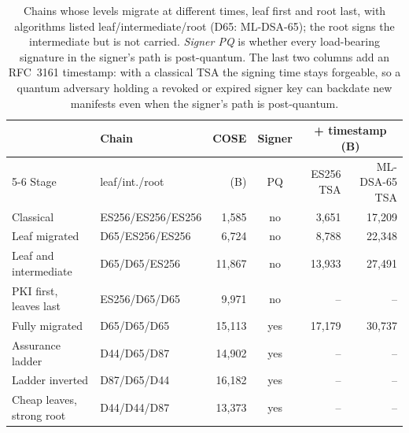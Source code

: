 \begin{table}[t]
\caption{Chains whose levels migrate at different times, leaf first and root last, with algorithms listed leaf/intermediate/root (D65: ML-DSA-65); the root signs the intermediate but is not carried. \emph{Signer PQ} is whether every load-bearing signature in the signer's path is post-quantum. The last two columns add an RFC~3161 timestamp: with a classical TSA the signing time stays forgeable, so a quantum adversary holding a revoked or expired signer key can backdate new manifests even when the signer's path is post-quantum.}
\label{tab:mixedchain}
\small
\setlength{\tabcolsep}{3.3pt}
\begin{tabular}{llrcrr}
\toprule
 & Chain & COSE & Signer & \multicolumn{2}{c}{+ timestamp (B)}\\
\cmidrule(lr){5-6}
Stage & leaf/int./root & (B) & PQ & ES256 TSA & ML-DSA-65 TSA\\
\midrule
Classical & ES256/ES256/ES256 & 1,585 & no & 3,651 & 17,209\\
Leaf migrated & D65/ES256/ES256 & 6,724 & no & 8,788 & 22,348\\
Leaf and intermediate & D65/D65/ES256 & 11,867 & no & 13,933 & 27,491\\
PKI first, leaves last & ES256/D65/D65 & 9,971 & no & -- & --\\
Fully migrated & D65/D65/D65 & 15,113 & yes & 17,179 & 30,737\\
Assurance ladder & D44/D65/D87 & 14,902 & yes & -- & --\\
Ladder inverted & D87/D65/D44 & 16,182 & yes & -- & --\\
Cheap leaves, strong root & D44/D44/D87 & 13,373 & yes & -- & --\\
\bottomrule
\end{tabular}
\end{table}
